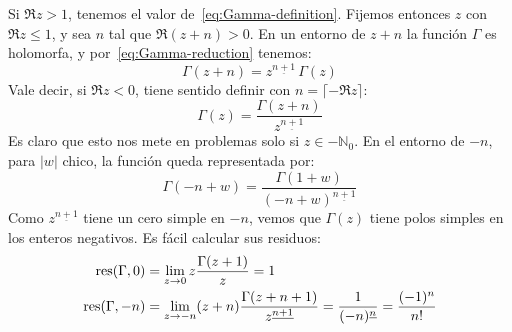   Si \(\Re z > 1\),
  tenemos el valor de~\eqref{eq:Gamma-definition}.
  Fijemos entonces \(z\) con \(\Re z \le 1\),
  y sea \(n\) tal que \(\Re (z + n) > 0\).
  En un entorno de \(z + n\) la función \(\Gamma\) es holomorfa,
  y por~\eqref{eq:Gamma-reduction} tenemos:
  \begin{equation*}
    \Gamma(z + n)
      = z^{\underline{n + 1}} \, \Gamma(z)
  \end{equation*}
  Vale decir,
  si \(\Re z < 0\),
  tiene sentido definir con \(n = \lceil - \Re z \rceil\):%
  \begin{equation}
    \label{eq:Gamma-reduction-n}
    \Gamma(z)
      = \frac{\Gamma(z + n)}{z^{\underline{n + 1}}}
  \end{equation}
  Es claro
  que esto nos mete en problemas solo si \(z \in -\mathbb{N}_0\).
  En el entorno de \(-n\),
  para \(\lvert w \rvert\) chico,
  la función queda representada por:
  \begin{equation*}
    \Gamma(- n + w)
      = \frac{\Gamma(1 + w)}{(-n + w)^{\underline{n + 1}}}
  \end{equation*}
  Como \(z^{\underline{n + 1}}\) tiene un cero simple en \(-n\),
  vemos que \(\Gamma(z)\)
  tiene polos simples en los enteros negativos.
  Es fácil calcular sus residuos:%
  \begin{equation}
    \label{eq:Gamma-residues}
    \begin{split}
      \operatorname{res}(\Gamma, 0)
	&= \lim_{z \rightarrow 0} z \frac{\Gamma(z + 1)}{z}
	 = 1 \\
      \operatorname{res}(\Gamma, -n)
	&= \lim_{z \rightarrow -n} (z + n)
	     \frac{\Gamma(z + n + 1)}{z^{\underline{n + 1}}}
	 = \frac{1}{(-n)^{\underline{n}}}
	 = \frac{(-1)^n}{n!}
    \end{split}
  \end{equation}

